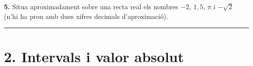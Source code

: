 \documentclass[13pt,a4paper]{extarticle}
\begin{document}
\par\noindent\begin{minipage}{\linewidth}
\textbf{5.} Situa aproximadament sobre una recta real els nombres $-2$, $1{,}5$, $\pi$ i $-\sqrt{2}$ (n'hi ha prou amb dues xifres decimals d'aproximació).\par
\end{minipage}\par\vspace{1.6mm}
\vspace{1mm}\hrule\vspace{3mm}

\section*{2. Intervals i valor absolut}
\end{document}

